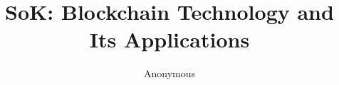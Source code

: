 \documentclass[10pt, conference, compsocconf]{IEEEtran}
\begin{document}
\title{SoK: Blockchain Technology and Its Applications}
\author{Anonymous}
\maketitle



\IEEEpeerreviewmaketitle
\thispagestyle{plain}
\pagestyle{plain}















\nocite{*}

\end{document}
